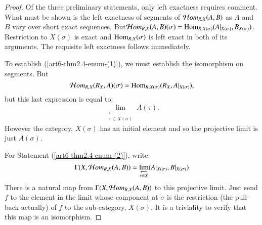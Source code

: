 \begin{proof}
Of the three preliminary statements, only left exactness requires comment. What must be shown is the left exactness of segments of $\mathcal{H} om_{R, X}(A, B)$ as $A$ and $B$ vary over short exact sequences. But\break $\mathcal{H} om_{R, X}(A, B)(\sigma) = \operatorname{Hom}_{R,X(\sigma)}(A|_{X(\sigma)}, B_{X(\sigma)})$. Restriction to $X(\sigma)$ is exact and $\operatorname{Hom}_{R, X}(\sigma)$ is left exact in both of its arguments. The requisite left exactness follows immediately.

To establish (\ref{art6-thm2.4-enum-(1)}), we must establish the isomorphism on segments. But
$$
\mathcal{H} om_{R, X}(R_{X}, A)(\sigma) = \operatorname{Hom}_{R,X(\sigma)}(R_{X}, A|_{X(\sigma)}),
$$
but this last expression is equal to:
$$
\lim_{\substack{\longleftarrow \\ \tau \in X(\sigma)}}A(\tau).
$$
However the category, $X(\sigma)$ has an initial element and so the projective limit is just $A(\sigma)$.

For Statement (\ref{art6-thm2.4-enum-(2)}), write:
$$
\Gamma(X, \mathcal{H} om_{R,X}(A, B)) = \lim_{\substack{\longleftarrow \\ \tau \in X}}(A|_{X(\sigma)}, B|_{X(\sigma)})
$$
There is a natural map from $\Gamma(X, \mathcal{H} om_{R,X}(A, B))$ to this projective limit. Just send $f$ to the element in the limit whose component at $\sigma$ is the restriction (the pull-back actually) of $f$ to the sub-category, $X(\sigma)$. It is a triviality to verify that this map is an isomorphism.


\end{proof}
